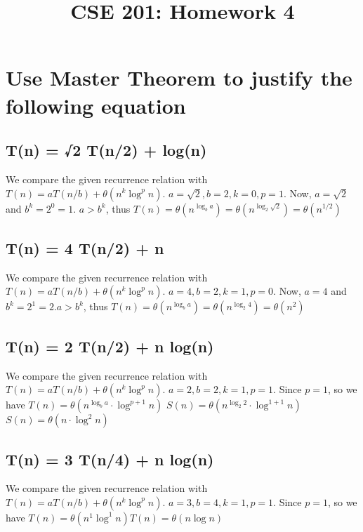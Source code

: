\documentclass[a4paper]{article}
\title{CSE 201: Homework 4}
\begin{document}
\maketitle
\section{Use Master Theorem to justify the following equation}
\subsection{  T(n) = √2 T(n/2) + log(n)}
We compare the given recurrence relation with $T(n)=a T(n / b)+\theta\left(n^k \log ^p n\right)$. $a=\sqrt{2}, b=2,k=0,p=1$. Now, $a = \sqrt{2}$ and $b^k = 2^0 = 1.$ $a>b^k$, thus $T(n)=\theta\left(n^{\log _b a}\right)=\theta\left(n^{\log _2 \sqrt{2}}\right)=\theta\left(n^{1 / 2}\right)$

\subsection{T(n) = 4 T(n/2) + n}
We compare the given recurrence relation with $T(n)=a T(n / b)+\theta\left(n^k \log ^p n\right)$. $a=4, b=2,k=1,p=0$. Now, $a = 4$ and $b^k = 2^1 = 2.$$a>b^k$, thus $T(n)=\theta\left(n^{\log _b a}\right)=\theta\left(n^{\log _2 4}\right)=\theta\left(n^{2}\right)$
  \subsection{T(n) = 2 T(n/2) + n log(n)}
  We compare the given recurrence relation with $T(n)=a T(n / b)+\theta\left(n^k \log ^p n\right)$. $a=2, b=2,k=1,p=1$. Since $p = 1$, so we have $T(n)=\theta\left(n^{\log _b a} \cdot \log ^{p+1} n\right)$
$S(n)=\theta\left(n^{\log _2 2} \cdot \log ^{1+1} n\right)$
$S(n)=\theta\left(n \cdot \log ^2 n\right)$
  \subsection{T(n) = 3 T(n/4) + n log(n)}
  We compare the given recurrence relation with $T(n)=a T(n / b)+\theta\left(n^k \log ^p n\right)$. $a=3, b=4,k=1,p=1$. Since $p=1$, so we have
$
T(n)=\theta\left(n^1 \log ^1 n\right)
T(n)=\theta\left(n \log  n\right)
$
\end{document}
